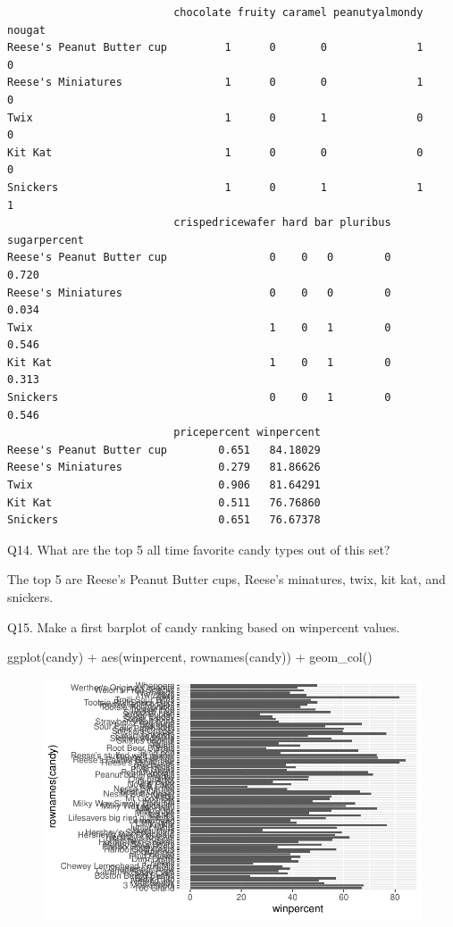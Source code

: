 \documentclass[
  letterpaper,
  DIV=11,
  numbers=noendperiod]{scrartcl}
\newenvironment{Shaded}{\begin{snugshade}}{\end{snugshade}}
\newcommand{\FunctionTok}[1]{\textcolor[rgb]{0.28,0.35,0.67}{#1}}
\newcommand{\NormalTok}[1]{\textcolor[rgb]{0.00,0.23,0.31}{#1}}
\newcommand{\SpecialCharTok}[1]{\textcolor[rgb]{0.37,0.37,0.37}{#1}}
\begin{document}
\begin{verbatim}
                          chocolate fruity caramel peanutyalmondy nougat
Reese's Peanut Butter cup         1      0       0              1      0
Reese's Miniatures                1      0       0              1      0
Twix                              1      0       1              0      0
Kit Kat                           1      0       0              0      0
Snickers                          1      0       1              1      1
                          crispedricewafer hard bar pluribus sugarpercent
Reese's Peanut Butter cup                0    0   0        0        0.720
Reese's Miniatures                       0    0   0        0        0.034
Twix                                     1    0   1        0        0.546
Kit Kat                                  1    0   1        0        0.313
Snickers                                 0    0   1        0        0.546
                          pricepercent winpercent
Reese's Peanut Butter cup        0.651   84.18029
Reese's Miniatures               0.279   81.86626
Twix                             0.906   81.64291
Kit Kat                          0.511   76.76860
Snickers                         0.651   76.67378
\end{verbatim}

Q14. What are the top 5 all time favorite candy types out of this set?

The top 5 are Reese's Peanut Butter cups, Reese's minatures, twix, kit
kat, and snickers.

Q15. Make a first barplot of candy ranking based on winpercent values.

\begin{Shaded}
\begin{Highlighting}[]
\FunctionTok{ggplot}\NormalTok{(candy) }\SpecialCharTok{+} 
  \FunctionTok{aes}\NormalTok{(winpercent, }\FunctionTok{rownames}\NormalTok{(candy)) }\SpecialCharTok{+} 
  \FunctionTok{geom\_col}\NormalTok{()}
\end{Highlighting}
\end{Shaded}

\begin{figure}[H]

{\centering \includegraphics{Class-9_files/figure-pdf/unnamed-chunk-17-1.pdf}

}

\end{figure}
\end{document}
